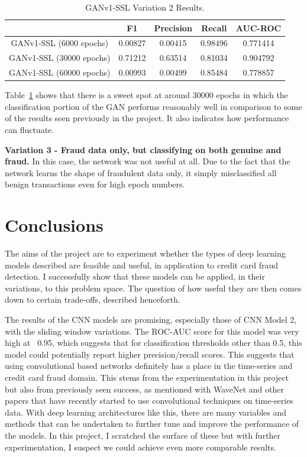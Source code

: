 \documentclass[12pt,a4paper,twoside]{report}
\begin{document}
\begin{table}[H]  
  \centering
  \begin{tabular}{ccccc}
    \toprule
           		& F1 & Precision & Recall & AUC-ROC \\ \midrule
    GANv1-SSL (6000 epochs) & 0.00827  &  0.00415 & 0.98496  & 0.771414 \\
    GANv1-SSL (30000 epochs) & 0.71212  &  0.63514 & 0.81034  & 0.904792 \\
    GANv1-SSL (60000 epochs) & 0.00993   &   0.00499 & 0.85484 & 0.778857  \\
   
   \bottomrule
 \end{tabular}
 \caption{GANv1-SSL Variation 2 Results.}
\label{table:ganv1-ssl-halfhalf}
\end{table}

Table~\ref{table:ganv1-ssl-halfhalf} shows that there is a sweet spot at around 30000 epochs in which the classification portion of the GAN performs reasonably well in comparison to some of the results seen previously in the project. It also indicates how performance can fluctuate. 

\textbf{Variation 3 - Fraud data only, but classifying on both genuine and fraud.}
In this case, the network was not useful at all. Due to the fact that the network learns the shape of fraudulent data only, it simply misclassified all benign transactions even for high epoch numbers. 


\chapter{Conclusions}

The aims of the project are to experiment whether the types of deep learning models described are feasible and useful, in application to credit card fraud detection. I successfully show that these models can be applied, in their variations, to this problem space. The question of how useful they are then comes down to certain trade-offs, described henceforth.

The results of the CNN models are promising, especially those of CNN Model 2, with the sliding window variations. The ROC-AUC score for this model was very high at ~0.95, which suggests that for classification thresholds other than 0.5, this model could potentially report higher precision/recall scores. This suggests that using convolutional based networks definitely has a place in the time-series and credit card fraud domain. This stems from the experimentation in this project but also from previously seen success, as mentioned with WaveNet\cite{DBLP:journals/corr/OordDZSVGKSK16} and other papers\cite{wang2017time}\cite{7979885} that have recently started to use convolutional techniques on time-series data. With deep learning architectures like this, there are many variables and methods that can be undertaken to further tune and improve the performance of the models. In this project, I scratched the surface of these but with further experimentation, I suspect we could achieve even more comparable results. 
\end{document}

